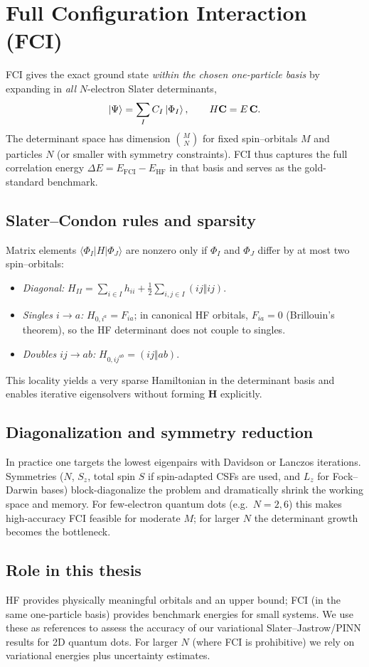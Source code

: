 \section{Full Configuration Interaction (FCI)}

FCI gives the exact ground state \emph{within the chosen one-particle basis} by expanding in
\emph{all} $N$-electron Slater determinants,
\[
\ket{\Psi}=\sum_{I} C_I \ket{\Phi_I},\qquad
H\mathbf C=E\,\mathbf C.
\]
The determinant space has dimension $\binom{M}{N}$ for fixed spin–orbitals $M$ and particles
$N$ (or smaller with symmetry constraints). FCI thus captures the full correlation energy
$\Delta E=E_\mathrm{FCI}-E_\mathrm{HF}$ in that basis and serves as the gold-standard benchmark.

\subsection{Slater--Condon rules and sparsity}
Matrix elements $\langle \Phi_I|H|\Phi_J\rangle$ are nonzero only if $\Phi_I$ and $\Phi_J$
differ by at most two spin–orbitals:
\begin{itemize}
\item \emph{Diagonal:} $H_{II}=\sum_{i\in I} h_{ii} + \tfrac12\sum_{i,j\in I} (ij\Vert ij)$.
\item \emph{Singles $i\!\to\!a$:} $H_{0,i^a}=F_{ia}$; in canonical HF orbitals, $F_{ia}=0$
(Brillouin’s theorem), so the HF determinant does not couple to singles.
\item \emph{Doubles $ij\!\to\!ab$:} $H_{0,ij^{ab}}=(ij\Vert ab)$.
\end{itemize}
This locality yields a very sparse Hamiltonian in the determinant basis and enables iterative
eigensolvers without forming $\mathbf H$ explicitly.

\subsection{Diagonalization and symmetry reduction}
In practice one targets the lowest eigenpairs with Davidson or Lanczos iterations. Symmetries
($N$, $S_z$, total spin $S$ if spin-adapted CSFs are used, and $L_z$ for Fock--Darwin bases)
block-diagonalize the problem and dramatically shrink the working space and memory. For
few-electron quantum dots (e.g.\ $N=2,6$) this makes high-accuracy FCI feasible for moderate
$M$; for larger $N$ the determinant growth becomes the bottleneck.

\subsection{Role in this thesis}
HF provides physically meaningful orbitals and an upper bound; FCI (in the same one-particle
basis) provides benchmark energies for small systems. We use these as references to assess the
accuracy of our variational Slater–Jastrow/PINN results for 2D quantum dots. For larger $N$
(where FCI is prohibitive) we rely on variational energies plus uncertainty estimates.
